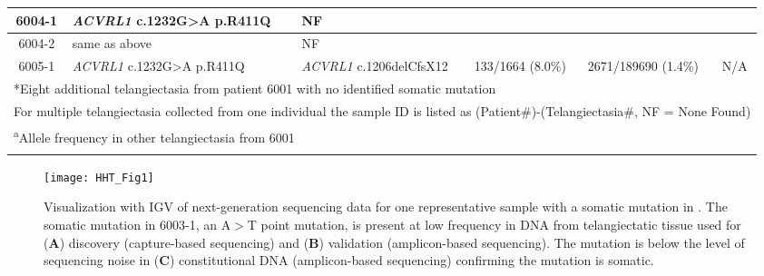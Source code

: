 \begin{sidewaystable}[]
\begin{tabularx}{\textheight}{c p{3.5cm} p{3.5cm} XXX}
6004-1 & \textit{ACVRL1} \newline c.1232G\textgreater{}A p.R411Q & NF &	 & & \\\hline
6004-2 & same as above & NF & & & \\\hline
6005-1 & \textit{ACVRL1} \newline c.1232G\textgreater{}A p.R411Q & \textit{ACVRL1} \newline c.1206delCfsX12 & 133/1664 (8.0\%) & 2671/189690 (1.4\%) & N/A \\
\bottomrule
\multicolumn{6}{l}{*Eight additional telangiectasia from patient 6001 with no identified somatic mutation} \\
\multicolumn{6}{l}{For multiple telangiectasia collected from one individual the sample ID is listed as (Patient\#)-(Telangiectasia\#, NF = None Found)} \\
\multicolumn{6}{l}{\textsuperscript{a}Allele frequency in other telangiectasia from 6001} \\
\label{HHT_Table_1}
\end{tabularx}

\end{sidewaystable}



\begin{figure}[tbp!]
\begin{center}
\texttt{[image: HHT\_Fig1]}
\end{center}
\caption[Low Frequency Somatic Mutations Detected in Telangiectasia.] {Visualization with IGV of next-generation sequencing data for one representative sample with a somatic mutation in . The somatic mutation in 6003-1, an A$>$T point mutation, is present at low frequency in DNA from telangiectatic tissue used for (\textbf{A}) discovery (capture-based sequencing) and (\textbf{B}) validation (amplicon-based sequencing). The mutation is below the level of sequencing noise in (\textbf{C}) constitutional DNA (amplicon-based sequencing) confirming the mutation is somatic.}

\label{HHT_Figure_1}
\end{figure}

